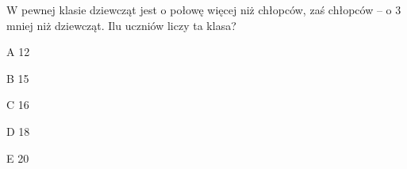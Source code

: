 \begin{tresc}
W pewnej klasie dziewcząt jest o połowę więcej niż chłopców, zaś chłopców – o 3 mniej niż dziewcząt. Ilu uczniów liczy ta klasa?
\end{tresc}
\begin{wariant}{A} 12 \end{wariant}
\begin{wariant}{B} 15 \end{wariant}
\begin{wariant}{C} 16 \end{wariant}
\begin{wariant}{D} 18 \end{wariant}
\begin{wariant}{E} 20 \end{wariant}

